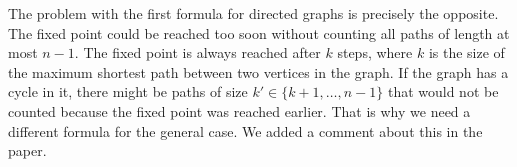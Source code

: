 \documentclass[a4paper]{article}
\begin{document}
\begin{itemize}
	The problem with the first formula for directed graphs is precisely the opposite. The fixed point could be reached too soon without counting all paths of length at most $n-1$. The fixed point is always reached after $k$ steps, where $k$ is the size of the maximum shortest path between two vertices in the graph. If the graph has a cycle in it, there might be paths of size $k' \in \{k+1,\ldots,n-1\}$ that would not be counted because the fixed point was reached earlier. That is why we need a different formula for the general case. We added a comment about this in the paper.
	
	
\end{itemize}
\end{document}
